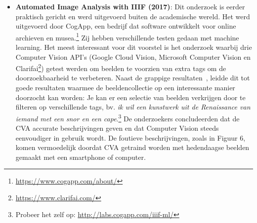 \documentclass[fleqn,10pt]{voorstel}
\begin{document}
\begin{itemize}
	\item \textbf{Automated Image Analysis with IIIF (2017)}: Dit onderzoek is eerder praktisch gericht en werd uitgevoerd buiten de academische wereld. Het werd uitgevoerd door CogApp, een bedrijf dat software ontwikkelt voor online archieven en musea.\footnote{\url{https://www.cogapp.com/about/}} Zij hebben verschillende testen gedaan met machine learning. Het meest interessant voor dit voorstel is het onderzoek waarbij drie Computer Vision API's (Google Cloud Vision, Microsoft Computer Vision en Clarifai\footnote{\url{https://www.clarifai.com/}}) getest werden om beelden te voorzien van extra tags om de doorzoekbaarheid te verbeteren. Naast de grappige resultaten~\autocite{Roddis2018}, leidde dit tot goede resultaten waarmee de beeldencollectie op een interessante manier doorzocht kan worden: Je kan er een selectie van beelden verkrijgen door te filteren op verschillende tags, bv. \emph{ik wil een kunstwerk uit de Renaissance van iemand met een snor en een cape}.\footnote{Probeer het zelf op: \url{http://labs.cogapp.com/iiif-ml/}} De onderzoekers concludeerden dat de CVA accurate beschrijvingen geven en dat Computer Vision steeds eenvoudiger in gebruik wordt. De foutieve beschrijvingen, zoals in Figuur 6, komen vermoedelijk doordat CVA getraind worden met hedendaagse beelden gemaakt met een smartphone of computer.~\autocite{Hindle2017}
	

\end{itemize}
\end{document}
